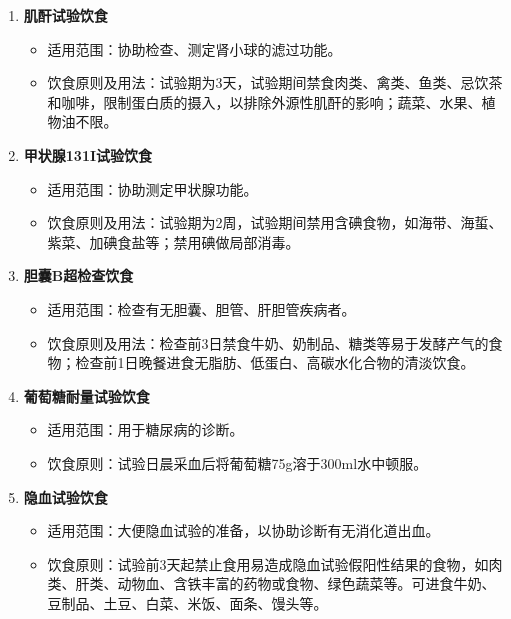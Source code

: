 \documentclass[11pt, a4paper]{ctexart}
\begin{document}
\begin{enumerate}
    \item \textbf{肌酐试验饮食}
    \begin{itemize}
        \item 适用范围：协助检查、测定肾小球的滤过功能。
        \item 饮食原则及用法：试验期为3天，试验期间禁食肉类、禽类、鱼类、忌饮茶和咖啡，限制蛋白质的摄入，以排除外源性肌酐的影响；蔬菜、水果、植物油不限。
    \end{itemize}
    \item \textbf{甲状腺131I试验饮食}
    \begin{itemize}
        \item 适用范围：协助测定甲状腺功能。
        \item 饮食原则及用法：试验期为2周，试验期间禁用含碘食物，如海带、海蜇、紫菜、加碘食盐等；禁用碘做局部消毒。
    \end{itemize}
    \item \textbf{胆囊B超检查饮食}
    \begin{itemize}
        \item 适用范围：检查有无胆囊、胆管、肝胆管疾病者。
        \item 饮食原则及用法：检查前3日禁食牛奶、奶制品、糖类等易于发酵产气的食物；检查前1日晚餐进食无脂肪、低蛋白、高碳水化合物的清淡饮食。
    \end{itemize}
    \item \textbf{葡萄糖耐量试验饮食}
    \begin{itemize}
        \item 适用范围：用于糖尿病的诊断。
        \item 饮食原则：试验日晨采血后将葡萄糖75g溶于300ml水中顿服。
    \end{itemize}
    \item \textbf{隐血试验饮食}
    \begin{itemize}
        \item 适用范围：大便隐血试验的准备，以协助诊断有无消化道出血。
        \item 饮食原则：试验前3天起禁止食用易造成隐血试验假阳性结果的食物，如肉类、肝类、动物血、含铁丰富的药物或食物、绿色蔬菜等。可进食牛奶、豆制品、土豆、白菜、米饭、面条、馒头等。
    \end{itemize}
\end{enumerate}
\end{document}
